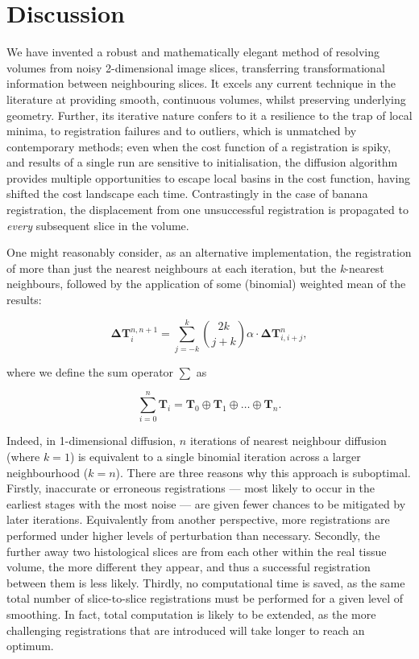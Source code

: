 
\section{Discussion} %
\label{sec:discussion}
  We have invented a robust and mathematically elegant method of resolving volumes from noisy 2-dimensional image slices, transferring transformational information between neighbouring slices. It excels any current technique in the literature at providing smooth, continuous volumes, whilst preserving underlying geometry. Further, its iterative nature confers to it a resilience to the trap of local minima, to registration failures and to outliers, which is unmatched by contemporary methods; even when the cost function of a registration is spiky, and results of a single run are sensitive to initialisation, the diffusion algorithm provides multiple opportunities to escape local basins in the cost function, having shifted the cost landscape each time. Contrastingly in the case of banana registration, the displacement from one unsuccessful registration is propagated to \emph{every} subsequent slice in the volume.
  
  One might reasonably consider, as an alternative implementation, the registration of more than just the nearest neighbours at each iteration, but the \emph{k}-nearest neighbours, followed by the application of some (binomial) weighted mean of the results:
  
  \begin{equation}
    \mathbf{\Delta T}_i^{n,n+1} = \sum_{j=-k}^k \binom{2k}{j+k}\alpha \cdot \mathbf{\Delta T}_{i,i+j}^n,
  \end{equation}
  
  where we define the sum operator $\sum$ as
  
  \begin{equation}
    \sum_{i=0}^n \mathbf{T}_i = \mathbf{T}_0 \oplus \mathbf{T}_1 \oplus \ldots \oplus \mathbf{T}_n.
  \end{equation}
  
  Indeed, in 1-dimensional diffusion, $n$ iterations of nearest neighbour diffusion (where $k=1$) is equivalent to a single binomial iteration across a larger neighbourhood ($k=n$). There are three reasons why this approach is suboptimal. Firstly, inaccurate or erroneous registrations --- most likely to occur in the earliest stages with the most noise --- are given fewer chances to be mitigated by later iterations. Equivalently from another perspective, more registrations are performed under higher levels of perturbation than necessary. Secondly, the further away two histological slices are from each other within the real tissue volume, the more different they appear, and thus a successful registration between them is less likely. Thirdly, no computational time is saved, as the same total number of slice-to-slice registrations must be performed for a given level of smoothing. In fact, total computation is likely to be extended, as the more challenging registrations that are introduced will take longer to reach an optimum.
  
